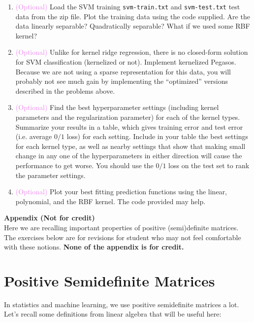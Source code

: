 \documentclass{article}
\theoremstyle{plain}
\theoremstyle{definition}
\begin{document}
\begin{enumerate}
  \setcounter{enumi}{\value{saveenum}}
\item \textcolor{violet}{(Optional)} Load the SVM training \texttt{svm-train.txt} and \texttt{svm-test.txt} test data from the zip file.
Plot the training data using the code supplied. Are the data linearly
separable? Quadratically separable? What if we used some RBF kernel?
\item \textcolor{violet}{(Optional)} Unlike for kernel ridge regression, there is no closed-form
solution for SVM classification (kernelized or not). Implement kernelized
Pegasos. Because we are not using a sparse representation for this
data, you will probably not see much gain by implementing the ``optimized''
versions described in the problems above.
\item \textcolor{violet}{(Optional)} Find the best hyperparameter settings (including kernel
parameters and the regularization parameter) for each of the kernel
types. Summarize your results in a table, which gives training error
and test error (i.e. average $0/1$ loss) for each setting. Include
in your table the best settings for each kernel type, as well as nearby
settings that show that making small change in any one of the hyperparameters
in either direction will cause the performance to get worse. You should
use the $0/1$ loss on the test set to rank the parameter settings. 
\item \textcolor{violet}{(Optional)} Plot your best fitting prediction functions using the
linear, polynomial, and the RBF kernel. The code provided may help.
\setcounter{saveenum}{\value{enumi}}
\end{enumerate}

\newpage

\appendix
{ \huge \bf Appendix (Not for credit)} \\[.2cm]

Here we are recalling important properties of positive (semi)definite matrices. 
The exercises below are for revisions for student who may not feel comfortable with these notions.  \textbf{None of the appendix is for credit. }

\section{Positive Semidefinite Matrices}

In statistics and machine learning, we use positive semidefinite matrices
a lot. Let's recall some definitions from linear algebra that will
be useful here:
\end{document}
